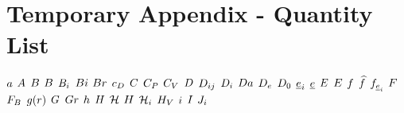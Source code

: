 \section{Temporary Appendix - Quantity List}

\begin{mdframed}

$\activity$ \newline
$\helmholtz$ \newline
$\magind$ \newline
$\exergy$ \newline
$\virialcoeff{i}$ \newline
$\biot$ \newline
$\brinkman$ \newline
$\dragcoeff$ \newline
$\conc$ \newline
$\cp$ \newline
$\cv$ \newline
$\elecdisplace$ \newline
$\diff$ \newline
$\pdiff$ \newline
$\damkohler$ \newline
$\eneatom$ \newline
$\mbde$ \newline
$\uv$ \newline
$\mcef$ \newline
$\elecfield$ \newline
$\energy$ \newline
$\fug$ \newline
$\mixfug$ \newline
$\dforce$ \newline
$\force$ \newline
$\bodyforce$ \newline
$\raddist$ \newline
$\gibbs$ \newline
$\grashof$ \newline
$\heattranscoeff$ \newline
$\magfield$ \newline
$\surfcurv$ \newline
$\enthalpy$ \newline
$\henry$ \newline
$\energysource$ \newline
$\currentdensity$ \newline
$\mominertia$ \newline
$\molspecflux$ \newline

\end{mdframed}
